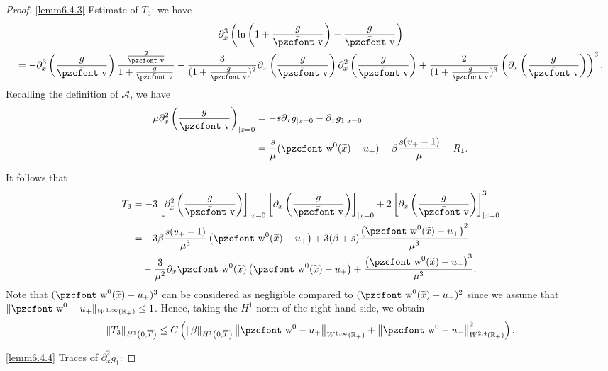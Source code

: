 \documentclass[10pt]{amsart}
\theoremstyle{definition}\newtheorem{defi}[theo]{Definition}\newtheorem{rema}[theo]{Remark}\newtheorem{exam}[theo]{Example}\newtheorem{exem}[theo]{Example}\newtheorem{nota}[theo]{Notation}
\newcommand{\mathpzc}[1]{\text{\pzcfont #1}}
\newcommand{\R}{\mathbb{R}}
\newcommand{\p}{\partial}
\newcommand{\bv}{\bar{\mathpzc{v}}}
\newcommand{\cA}{\mathcal A}
\newcommand{\tw}{\mathpzc{w}}
\newcommand{\tx}{\widetilde{x}}
\begin{document}
\begin{proof}
\noindent\eqref{lemm6.4.3} Estimate of $T_3$: we have
\begin{multline*}
\partial^3_x \left(\ln \left(1+ \frac{g}{\bv}\right) - \frac{g}{\bv} \right)\\ = - \partial^3_x \left(\frac{g}{\bv}\right) \dfrac{\frac{g}{\bv}}{1+ \frac{g}{\bv}} - \dfrac{3}{(1+\frac{g}{\bv})^2} \partial_x \left(\frac{g}{\bv}\right) \partial^2_x \left(\frac{g}{\bv}\right)
+ \dfrac{2}{(1+ \frac{g}{\bv})^3}\left(\partial_x \left(\frac{g}{\bv}\right)\right)^3.
\end{multline*}
Recalling the definition of $\cA$, we have
\begin{align*}
\mu \p_x^2 \left(\frac{g}{\bv}\right)_{|x=0}&=-s\p_x g_{|x=0} - \p_x g_{1|x=0}\\
&=\frac{s}{\mu} (\tw^0(\tx) - u_+) - \beta \frac{s(v_+-1)}{\mu} - R_1.
\end{align*}


It follows that
\begin{align*}
T_3 & = - 3 \left[\partial^2_x \left(\frac{g}{\bv}\right)\right]_{|x=0} \left[\partial_x \left(\frac{g}{\bv}\right)\right]_{|x=0} + 2\left[\partial_x \left(\frac{g}{\bv}\right)\right]^3_{|x=0} \\
& = -3\beta\dfrac{s(v_+-1)}{\mu^3} \left(\tw^0(\tx) - u_+\right) + 3 (\beta +s) \dfrac{\left(\tw^0(\tx)-u_+\right)^2}{\mu^3} \\
& \quad - \dfrac{3}{\mu^2} \partial_x \tw^0(\tx) \left(\tw^0(\tx)-u_+\right) + \dfrac{\left(\tw^0(\tx) - u_+\right)^3}{\mu^3}.
\end{align*}
Note that $(\tw^0(\tx)-u_+)^3$ can be considered as negligible compared to $(\tw^0(\tx) - u_+)^2$ since we assume that $\|\tw^0 - u_+\|_{W^{1, \infty}(\R_+)} \leq 1$. Hence, taking the $H^1$ norm of the right-hand side, we obtain
\[
\|T_3\|_{H^1\left(0,\overline{T}\right)}\leq C \left(\|\beta\|_{H^1\left(0, \overline{T}\right)}\left\|\tw^0-u_+\right\|_{W^{1,\infty}(\R_+)} + \left\|\tw^0-u_+\right\|_{W^{2,4}(\R_+)}^2\right).
\]

\noindent\eqref{lemm6.4.4} Traces of $\partial^2_x g_1$:



\end{proof}
\end{document}
